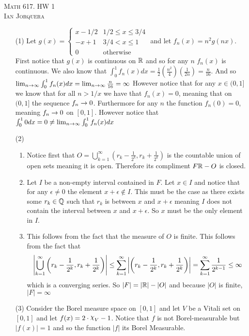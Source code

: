 \documentclass[12pt]{amsart}
\DeclareRobustCommand{\rchi}{{\mathpalette\irchi\relax}}
\newcommand{\irchi}[2]{\raisebox{\depth}{$#1\chi$}} %
\begin{document}
\begin{center}
   \textsc{Math 617. HW 1\\ Ian Jorquera}
\end{center}
\vspace{1em}

\begin{itemize}
   \item[(1)] 
   Let $g(x)=\begin{cases}
    x-1/2 & 1/2\leq x\leq 3/4\\
    -x+1 & 3/4< x\leq 1\\
    0 & \text{otherwise}
   \end{cases}$ and let $f_n(x)=n^2g(nx)$. First notice that $g(x)$ is continuous on $\mathbb{R}$ and so for any $n$ $f_n(x)$ is continuous.
   We also know that $\int_0^1f_n(x)dx=\frac{1}{2}(\frac{n^2}{4})(\frac{1}{2n})=\frac{n}{16}$. And so 
   $\lim_{n\rightarrow\infty}\int_0^1f_n(x)dx=\lim_{n\rightarrow\infty}\frac{n}{16}=\infty$
   However notice that for any $x\in(0,1]$ we know that for all $n>1/x$ we have that $f_n(x)=0$, meaning that on 
   $(0,1]$ the sequence $f_n\rightarrow 0$. Furthermore for any $n$ the function $f_n(0)=0$, meaning
   $f_n\rightarrow 0$ on $[0,1]$. However notice that $\int_0^1 0 dx=0\neq \lim_{n\rightarrow\infty}\int_0^1f_n(x)dx$

    \item[(2)] 
    \begin{enumerate}[label= (\alph*)]
        \item Notice first that $O = \bigcup_{k=1}^{\infty} (r_k-\frac{1}{2^k}, r_k+\frac{1}{2^k})$ 
    is the countable union of open sets meaning it is open. Therefore its compliment $F\mathbb{R}-O$ is closed.
        \item Let $I$ be a non-empty interval contained in $F$. Let $x\in I$ and notice that for any 
              $\epsilon\neq0$ the element $x+\epsilon\not\in I$. This must be the case as there exists some
              $r_k\in \mathbb{Q}$ such that $r_k$ is between $x$ and $x+\epsilon$ meaning $I$ does not contain the interval
              between $x$ and $x+\epsilon$. So $x$ must be the only element in $I$.

        \item This follows from the fact that the measure of $O$ is finite. This follows from the fact 
        that 
        \[\left\vert \bigcup_{k=1}^{\infty} \left(r_k-\frac{1}{2^k}, r_k+\frac{1}{2^k}\right) \right\vert
        \leq \sum_{k=1}^{\infty} \left\vert \left(r_k-\frac{1}{2^k}, r_k+\frac{1}{2^k}\right) \right\vert
        = \sum_{k=1}^{\infty} \frac{1}{2^{k-1}}\leq \infty\]
        which is a converging series. So $|F|=|\mathbb{R}|-|O|$ and because $|O|$ is finite, $|F|=\infty$
    \end{enumerate}
    \item[(3)] Consider the Borel measure space on $[0,1]$ and let $V$ be a Vitali set on $[0,1]$ and let 
    $f(x)=2\cdot\rchi_V-1$. Notice that $f$ is not Borel-measurable but $|f(x)|=1$ and so the function $|f|$ its
    Borel Measurable. 


\end{itemize}
\end{document}
